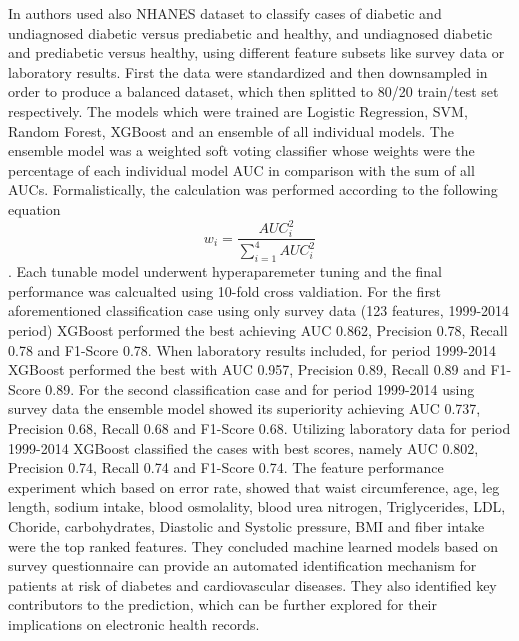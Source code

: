 \documentclass[journal,article,submit,pdftex,moreauthors]{Definitions/mdpi}
\begin{document}
\par In \cite{Dinh} authors used also NHANES dataset to classify cases of diabetic and undiagnosed
diabetic versus prediabetic and healthy, and undiagnosed diabetic and prediabetic versus healthy,
using different feature subsets like survey data or laboratory results.
First the data were standardized and then downsampled in order to 
produce a balanced dataset, which then splitted to 80/20 train/test set respectively.
The models which were trained are Logistic Regression, SVM, Random Forest, XGBoost and an ensemble
of all individual models. The ensemble model was a weighted soft voting classifier whose weights 
were the percentage of each individual model AUC in comparison with the sum of all AUCs. Formalistically,
the calculation was performed according to the following equation
\begin{equation}
	w_i=\frac{AUC_{i}^{2}}{\sum_{i=1}^{4}AUC_{i}^{2}}
\end{equation}. Each tunable model underwent hyperaparemeter tuning and the final performance
was calcualted using 10-fold cross valdiation.
For the first aforementioned classification case using only survey data (123 features, 1999-2014 period) 
XGBoost performed the best achieving AUC 0.862, Precision 0.78, Recall 0.78 and F1-Score
0.78. When laboratory results included, for period 1999-2014 XGBoost performed the best with AUC 0.957, Precision 0.89,
Recall 0.89 and F1-Score 0.89.
For the second classification case and for period 1999-2014 using survey data the ensemble model
showed its superiority achieving AUC 0.737, Precision 0.68, Recall 0.68 and F1-Score 0.68.
Utilizing laboratory data for period 1999-2014 XGBoost
classified the cases with best scores, namely AUC 0.802, Precision 0.74, Recall 0.74 and
F1-Score 0.74. The feature performance experiment which based on error rate, showed that waist circumference, age, leg length, 
sodium intake, blood osmolality, blood urea nitrogen, Triglycerides, LDL, Choride,
carbohydrates, Diastolic and Systolic pressure, BMI and fiber intake
were  the top ranked features. They concluded machine learned models based on survey questionnaire can 
provide an automated identification mechanism for patients at risk of diabetes and 
cardiovascular diseases. They also identified key contributors to the prediction, which can 
be further explored for their implications on electronic health records.
\end{document}

